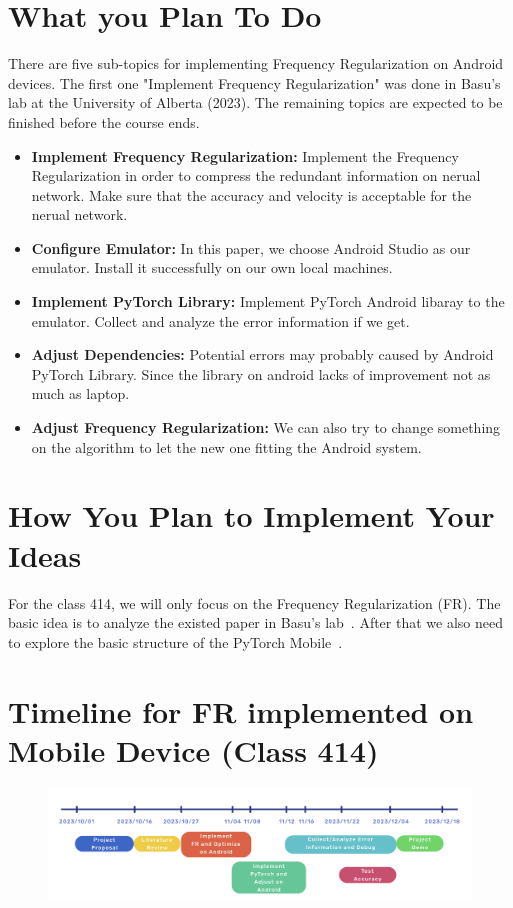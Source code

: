 \documentclass{article}
\begin{document}
\section*{What you Plan To Do}
There are five sub-topics for implementing Frequency Regularization on Android devices. The first one "Implement Frequency Regularization" was done in Basu's lab at the University of Alberta (2023). The remaining topics are expected to be finished before the course ends.


\begin{itemize}
	\item \textbf{Implement Frequency Regularization:} Implement the Frequency Regularization in order to compress the redundant information on nerual network. Make sure that the accuracy and velocity is acceptable for the nerual network.
	
	\item \textbf{Configure Emulator:} In this paper, we choose Android Studio as our emulator. Install it successfully on our own local machines.
	
	\item \textbf{Implement PyTorch Library:} Implement PyTorch Android libaray to the emulator. Collect and analyze the error information if we get.
	
	\item \textbf{Adjust Dependencies:} Potential errors may probably caused by Android PyTorch Library. Since the library on android lacks of improvement not as much as laptop.
	
	\item \textbf{Adjust Frequency Regularization:} We can also try to change something on the algorithm to let the new one fitting the Android system.
	
\end{itemize}

\section*{How You Plan to Implement Your Ideas}

For the class 414, we will only focus on the Frequency Regularization (FR). The basic idea is to analyze the existed paper in Basu's lab~\cite{zhao2023frequency}. After that we also need to explore the basic structure of the PyTorch Mobile~\cite{pytorch_mobile}.



\section*{Timeline for FR implemented on Mobile Device (Class 414)}
\begin{figure}[!h]
\centering
\includegraphics[width=1\textwidth]{./figure/timeline.png}
 \label{timeline_fig}
\end{figure}
\end{document}
